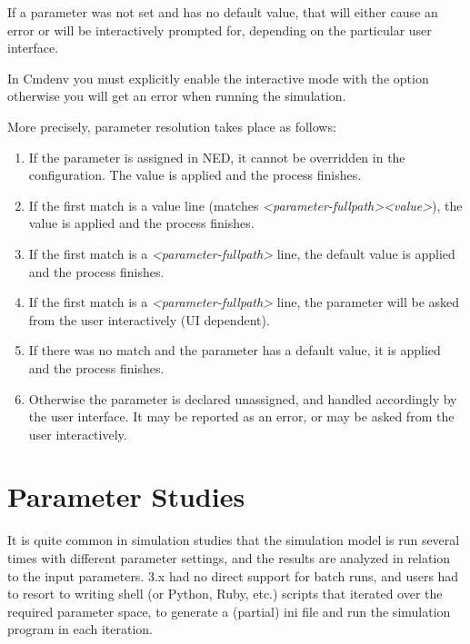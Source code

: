If a parameter was not set and has no default value, that will either
cause an error or will be interactively prompted for, depending
on the particular user interface.

\begin{note}
In Cmdenv you must explicitly enable the interactive mode with the
 option otherwise you will get an error
when running the simulation.
\end{note}

More precisely, parameter resolution takes place as follows:

\begin{enumerate}
\item If the parameter is assigned in NED, it cannot be overridden in the
    configuration. The value is applied and the process finishes.
\item If the first match is a value line (matches
    \textit{<parameter-fullpath>}\ttt{=}\textit{<value>}), the value is
    applied and the process finishes.
\item If the first match is a \textit{<parameter-fullpath>} line,
    the default value is applied and the process finishes.
\item If the first match is a \textit{<parameter-fullpath>} line,
    the parameter will be asked from the user interactively (UI dependent).
\item If there was no match and the parameter has a default value, it is applied
    and the process finishes.
\item Otherwise the parameter is declared unassigned, and handled accordingly
    by the user interface. It may be reported as an error, or may be
    asked from the user interactively.
\end{enumerate}


\section{Parameter Studies}

It is quite common in simulation studies that the simulation model is
run several times with different parameter settings, and the results
are analyzed in relation to the input parameters. {\opp} 3.x had no
direct support for batch runs, and users had to resort to writing shell
(or Python, Ruby, etc.) scripts that iterated over the required
parameter space, to generate a (partial) ini file and run the
simulation program in each iteration.

